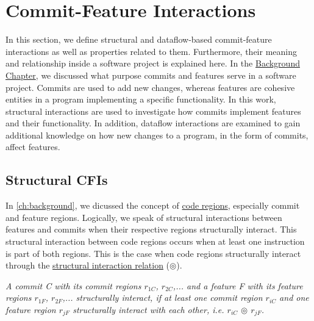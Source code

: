\chapter{Commit-Feature Interactions}\label{ch:example_chapter}

In this section, we define structural and dataflow-based commit-feature interactions as well as properties related to them.
Furthermore, their meaning and relationship inside a software project is explained here. 
In the \hyperref[ch:background]{Background Chapter}, we discussed what purpose commits and features serve in a software project.
Commits are used to add new changes, whereas features are cohesive entities in a program implementing a specific functionality.
In this work, structural interactions are used to investigate how commits implement features and their functionality.
In addition, dataflow interactions are examined to gain additional knowledge on how new changes to a program, in the form of commits, affect features. 

\section{Structural CFIs}\label{sec:structural_cfis}

In \autoref{ch:background}, we dicussed the concept of \hyperref[ch:code_regions]{code regions}, especially commit and feature regions. 
Logically, we speak of structural interactions between features and commits when their respective regions structurally interact. 
This structural interaction between code regions occurs when at least one instruction is part of both regions.
This is the case when code regions structurally interact through the \hyperref[def:structural_relation]{structural interaction relation} ($\circledcirc$).

\begin{definition}\label{def:structural_cfi}
\emph{A commit C with its commit regions $r_{1C}$, $r_{2C}$,... and a feature F with its feature regions $r_{1F}$, $r_{2F}$,... structurally interact, if at least one commit region $r_{iC}$ and one feature region $r_{jF}$ structurally interact with each other, i.e. $r_{iC}$ $\circledcirc$ $r_{jF}$.}
\end{definition}

